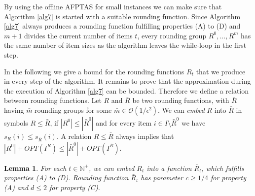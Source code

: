\documentclass[a4paper,11pt]{article}
\newtheorem{lem}[thm]{Lemma}
\begin{document}
By using the offline AFPTAS for small instances we can make sure that Algorithm \ref{alg7} is started with
a suitable rounding function. Since Algorithm \ref{alg7} always produces a rounding function fulfilling properties (A) to (D)
and $m+1$ divides the current number of items $t$, every rounding group $R^0, \ldots , R^m$ has the same
number of item sizes as the algorithm leaves the while-loop in the first step.

In the following we give a bound for the rounding functions $R_t$ that we produce in every step of
the algorithm. 
It remains to prove that the approximation during the execution of Algorithm \ref{alg7} can be bounded.
Therefore we define a relation between rounding functions.
Let $R$ and $\bar{R}$ be two rounding functions, with $\bar{R}$ having $\bar{m}$ rounding groups for 
some $\bar{m} \in \mathcal{O}(1/\epsilon^2)$.
We can \emph{embed} $R$ into $\bar{R}$ in symbols $R \leq \bar{R}$, if $|R^0| \leq |\bar{R}^0|$ and for 
every item $i \in I \setminus \bar{R}^0$ we 
have $s_{R}(i) \leq s_{\bar{R}}(i)$. A relation $R \leq \bar{R}$ always implies that 
$|R^0| + \mathit{OPT}(I^{R}) \leq |\bar{R}^0| + \mathit{OPT}(I^{\bar{R}})$.
\begin{lem}\label{lem14}
  For each $t\in \mathbb{N^{+}}$, we can embed $R_{t}$ into a function
  $\bar{R}_t$, which fulfills properties (A) to (D). Rounding function $\bar{R}_t$ has parameter
  $c \geq 1/4$ for property (A) and $d \leq 2$ for property (C).
\end{lem}
\end{document}
